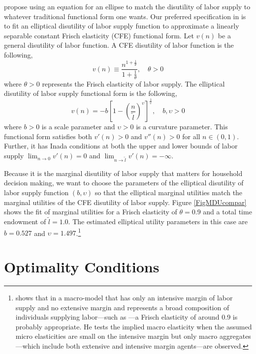   \citet{EvansPhillips:2017} propose using an equation for an ellipse to match the disutility of labor supply to whatever traditional functional form one wants. Our preferred specification in \ogindia is to fit an elliptical disutility of labor supply function to approximate a linearly separable constant Frisch elasticity (CFE) functional form. Let $v(n)$ be a general disutility of labor function. A CFE disutility of labor function is the following,
  \begin{equation}\label{EqCFE}
    v(n) \equiv \frac{n^{1+\frac{1}{\theta}}}{1+\frac{1}{\theta}}, \quad\theta > 0
  \end{equation}
  where $\theta>0$ represents the Frisch elasticity of labor supply. The elliptical disutility of labor supply functional form is the following,
  \begin{equation}\label{EqEllipDisut}
    v(n) = -b\left[1 - \left(\frac{n}{\tilde{l}}\right)^\upsilon\right]^{\frac{1}{\upsilon}}, \quad b,\upsilon>0
  \end{equation}
  where $b>0$ is a scale parameter and $\upsilon>0$ is a curvature parameter. This functional form satisfies both $v'(n)>0$ and $v''(n)>0$ for all $n\in(0,1)$. Further, it has Inada conditions at both the upper and lower bounds of labor supply $\lim_{n\rightarrow 0}v'(n) = 0$ and $\lim_{n\rightarrow \tilde{l}}v'(n) = -\infty$.

  Because it is the marginal disutility of labor supply that matters for household decision making, we want to choose the parameters of the elliptical disutility of labor supply function $(b,\upsilon)$ so that the elliptical marginal utilities match the marginal utilities of the CFE disutility of labor supply. Figure \ref{FigMDUcompar} shows the fit of marginal utilities for a Frisch elasticity of $\theta=0.9$ and a total time endowment of $\tilde{l}=1.0$. The estimated elliptical utility parameters in this case are $b=0.527$ and $\upsilon=1.497$.\footnote{\citet{Peterman:2016} shows that in a macro-model that has only an intensive margin of labor supply and no extensive margin and represents a broad composition of individuals supplying labor---such as \ogindia---a Frisch elasticity of around 0.9 is probably appropriate. He tests the implied macro elasticity when the assumed micro elasticities are small on the intensive margin but only macro aggregates---which include both extensive and intensive margin agents---are observed.}


\section{Optimality Conditions}\label{SecHHeulers}

